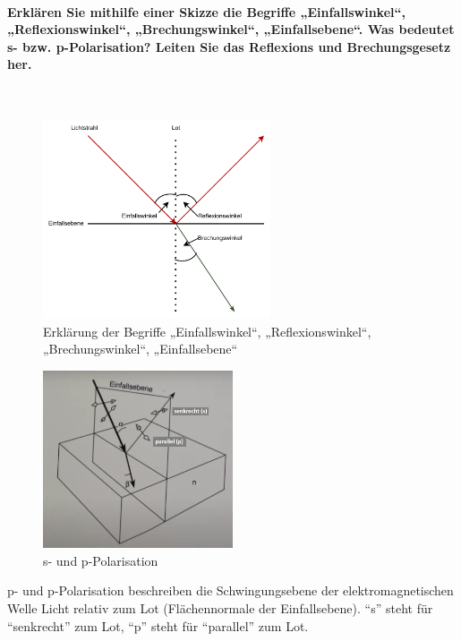 \documentclass[a4paper, 11pt, ngerman, parskip=half-]{scrartcl}
\newcommand{\myparagraph}[1]{\paragraph{#1}\mbox{}\\}
\begin{document}
\myparagraph{Erklären Sie mithilfe einer Skizze die Begriffe „Einfallswinkel“, „Reflexionswinkel“, „Brechungswinkel“, „Einfallsebene“. Was bedeutet s- bzw. p-Polarisation? Leiten Sie das Reflexions und Brechungsgesetz her.}
%
\begin{figure}[H]
    \centering
    \begin{samepage}
        \includegraphics[width=0.6\textwidth]{image/15/brechung_reflexion2.pdf}
        \caption{Erklärung der Begriffe „Einfallswinkel“, „Reflexionswinkel“, „Brechungswinkel“, „Einfallsebene“}
        \label{fig:reflexion_brechung}
    \end{samepage}
\end{figure}
%
\begin{figure}[!h]
    \centering
    \begin{samepage}
        \includegraphics[width=0.5\textwidth]{image/15/p_s_polarisation.png}
        \caption{s- und p-Polarisation}
        \label{fig:s-p-polarisation}
    \end{samepage}
\end{figure}
%
p- und p-Polarisation beschreiben die Schwingungsebene der elektromagnetischen Welle Licht relativ zum Lot (Flächennormale der Einfallsebene). \enquote{s} steht für \enquote{senkrecht} zum Lot, \enquote{p} steht für \enquote{parallel} zum Lot.
%
\end{document}
